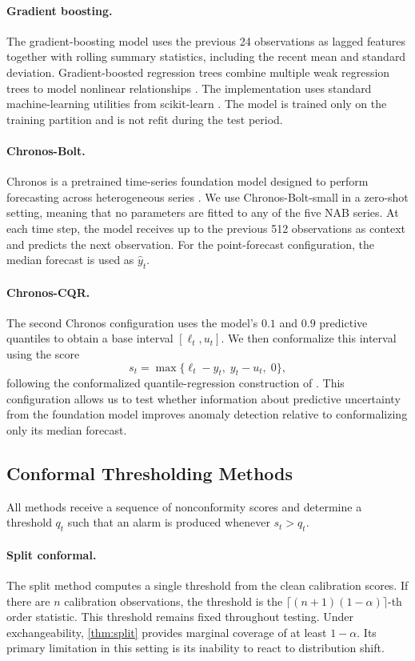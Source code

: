 \documentclass[11pt]{article}
\theoremstyle{definition}
\theoremstyle{remark}
\newcommand{\yhat}{\hat{y}}
\begin{document}
\paragraph{Gradient boosting.}
The gradient-boosting model uses the previous 24 observations as lagged features together with rolling summary statistics, including the recent mean and standard deviation. Gradient-boosted regression trees combine multiple weak regression trees to model nonlinear relationships \cite{friedman2001greedy}. The implementation uses standard machine-learning utilities from scikit-learn \cite{pedregosa2011scikit}. The model is trained only on the training partition and is not refit during the test period.

\paragraph{Chronos-Bolt.}
Chronos is a pretrained time-series foundation model designed to perform forecasting across heterogeneous series \cite{ansari2024chronos}. We use Chronos-Bolt-small in a zero-shot setting, meaning that no parameters are fitted to any of the five NAB series. At each time step, the model receives up to the previous 512 observations as context and predicts the next observation. For the point-forecast configuration, the median forecast is used as $\yhat_t$.

\paragraph{Chronos-CQR.}
The second Chronos configuration uses the model's $0.1$ and $0.9$ predictive quantiles to obtain a base interval $[\ell_t, u_t]$. We then conformalize this interval using the score
\[
  s_t = \max\{ \ell_t - y_t,\; y_t - u_t,\; 0 \},
\]
following the conformalized quantile-regression construction of \cite{romano2019conformalized}. This configuration allows us to test whether information about predictive uncertainty from the foundation model improves anomaly detection relative to conformalizing only its median forecast.

\subsection{Conformal Thresholding Methods}

All methods receive a sequence of nonconformity scores and determine a threshold $q_t$ such that an alarm is produced whenever $s_t > q_t$.

\paragraph{Split conformal.}
The split method computes a single threshold from the clean calibration scores. If there are $n$ calibration observations, the threshold is the $\lceil (n+1)(1-\alpha) \rceil$-th order statistic. This threshold remains fixed throughout testing. Under exchangeability, \cref{thm:split} provides marginal coverage of at least $1-\alpha$. Its primary limitation in this setting is its inability to react to distribution shift.
\end{document}
